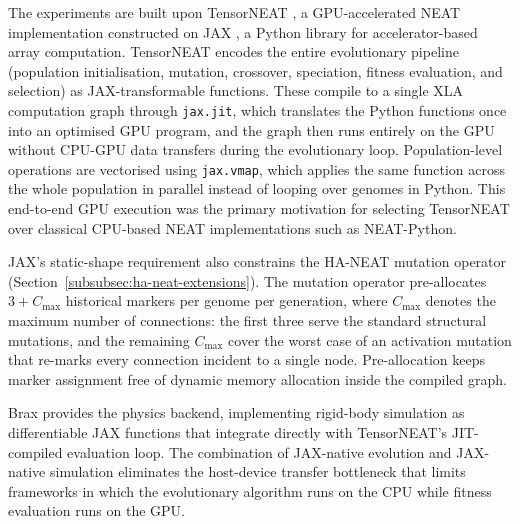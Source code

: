 The experiments are built upon TensorNEAT \parencite{wang_tensorized_2024}, a GPU-accelerated NEAT implementation constructed on JAX \parencite{bradbury_jax_2018}, a Python library for accelerator-based array computation.
TensorNEAT encodes the entire evolutionary pipeline (population initialisation, mutation, crossover, speciation, fitness evaluation, and selection) as JAX-transformable functions. These compile to a single XLA computation graph through \texttt{jax.jit}, which translates the Python functions once into an optimised GPU program, and the graph then runs entirely on the GPU without CPU-GPU data transfers during the evolutionary loop.
Population-level operations are vectorised using \texttt{jax.vmap}, which applies the same function across the whole population in parallel instead of looping over genomes in Python.
This end-to-end GPU execution was the primary motivation for selecting TensorNEAT over classical CPU-based NEAT implementations such as NEAT-Python.

JAX's static-shape requirement also constrains the HA-NEAT mutation operator (Section~\ref{subsubsec:ha-neat-extensions}).
The mutation operator pre-allocates $3 + C_{\max}$ historical markers per genome per generation, where $C_{\max}$ denotes the maximum number of connections: the first three serve the standard structural mutations, and the remaining $C_{\max}$ cover the worst case of an activation mutation that re-marks every connection incident to a single node.
Pre-allocation keeps marker assignment free of dynamic memory allocation inside the compiled graph.

Brax \parencite{freeman_brax_2021} provides the physics backend, implementing rigid-body simulation as differentiable JAX functions that integrate directly with TensorNEAT's JIT-compiled evaluation loop.
The combination of JAX-native evolution and JAX-native simulation eliminates the host-device transfer bottleneck that limits frameworks in which the evolutionary algorithm runs on the CPU while fitness evaluation runs on the GPU.


